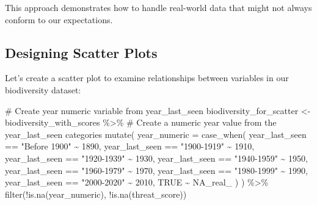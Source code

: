 \documentclass[
  letterpaper,
]{book}
\newenvironment{Shaded}{\begin{snugshade}}{\end{snugshade}}
\newcommand{\AttributeTok}[1]{\textcolor[rgb]{0.40,0.45,0.13}{#1}}
\newcommand{\CommentTok}[1]{\textcolor[rgb]{0.37,0.37,0.37}{#1}}
\newcommand{\ConstantTok}[1]{\textcolor[rgb]{0.56,0.35,0.01}{#1}}
\newcommand{\DecValTok}[1]{\textcolor[rgb]{0.68,0.00,0.00}{#1}}
\newcommand{\FunctionTok}[1]{\textcolor[rgb]{0.28,0.35,0.67}{#1}}
\newcommand{\NormalTok}[1]{\textcolor[rgb]{0.00,0.23,0.31}{#1}}
\newcommand{\OtherTok}[1]{\textcolor[rgb]{0.00,0.23,0.31}{#1}}
\newcommand{\SpecialCharTok}[1]{\textcolor[rgb]{0.37,0.37,0.37}{#1}}
\newcommand{\StringTok}[1]{\textcolor[rgb]{0.13,0.47,0.30}{#1}}
\begin{document}
This approach demonstrates how to handle real-world data that might not
always conform to our expectations.

\subsection{Designing Scatter Plots}\label{designing-scatter-plots}

Let's create a scatter plot to examine relationships between variables
in our biodiversity dataset:

\begin{Shaded}
\begin{Highlighting}[]
\CommentTok{\# Create year numeric variable from year\_last\_seen}
\NormalTok{biodiversity\_for\_scatter }\OtherTok{\textless{}{-}}\NormalTok{ biodiversity\_with\_scores }\SpecialCharTok{\%\textgreater{}\%}
  \CommentTok{\# Create a numeric year value from the year\_last\_seen categories}
  \FunctionTok{mutate}\NormalTok{(}
    \AttributeTok{year\_numeric =} \FunctionTok{case\_when}\NormalTok{(}
\NormalTok{      year\_last\_seen }\SpecialCharTok{==} \StringTok{"Before 1900"} \SpecialCharTok{\textasciitilde{}} \DecValTok{1890}\NormalTok{,}
\NormalTok{      year\_last\_seen }\SpecialCharTok{==} \StringTok{"1900{-}1919"} \SpecialCharTok{\textasciitilde{}} \DecValTok{1910}\NormalTok{,}
\NormalTok{      year\_last\_seen }\SpecialCharTok{==} \StringTok{"1920{-}1939"} \SpecialCharTok{\textasciitilde{}} \DecValTok{1930}\NormalTok{,}
\NormalTok{      year\_last\_seen }\SpecialCharTok{==} \StringTok{"1940{-}1959"} \SpecialCharTok{\textasciitilde{}} \DecValTok{1950}\NormalTok{,}
\NormalTok{      year\_last\_seen }\SpecialCharTok{==} \StringTok{"1960{-}1979"} \SpecialCharTok{\textasciitilde{}} \DecValTok{1970}\NormalTok{,}
\NormalTok{      year\_last\_seen }\SpecialCharTok{==} \StringTok{"1980{-}1999"} \SpecialCharTok{\textasciitilde{}} \DecValTok{1990}\NormalTok{,}
\NormalTok{      year\_last\_seen }\SpecialCharTok{==} \StringTok{"2000{-}2020"} \SpecialCharTok{\textasciitilde{}} \DecValTok{2010}\NormalTok{,}
      \ConstantTok{TRUE} \SpecialCharTok{\textasciitilde{}} \ConstantTok{NA\_real\_}
\NormalTok{    )}
\NormalTok{  ) }\SpecialCharTok{\%\textgreater{}\%}
  \FunctionTok{filter}\NormalTok{(}\SpecialCharTok{!}\FunctionTok{is.na}\NormalTok{(year\_numeric), }\SpecialCharTok{!}\FunctionTok{is.na}\NormalTok{(threat\_score))}


\end{Highlighting}
\end{Shaded}
\end{document}
